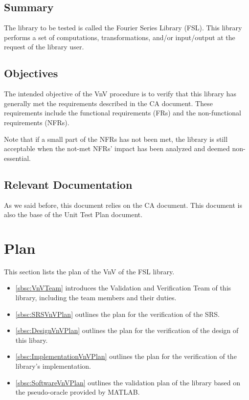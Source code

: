 \documentclass[12pt, titlepage]{article}
\begin{document}
\subsection{Summary}

The library to be tested is called the Fourier Series Library (FSL). This
library performs a set of computations, transformations, and/or input/output at
the request of the library user.

\subsection{Objectives}

The intended objective of the VnV procedure is to verify that this library has
generally met the requirements described in the CA document. These requirements
include the functional requirements (FRs) and the non-functional requirements
(NFRs).

Note that if a small part of the NFRs has not been met, the library is still
acceptable when the not-met NFRs' impact has been analyzed and deemed
non-essential.

\subsection{Relevant Documentation}

As we said before, this document relies on the CA document. This document is
also the base of the Unit Test Plan document.


\section{Plan}
This section lists the plan of the VnV of the FSL library.
\begin{itemize}
	\item \autoref{sbsc:VnVTeam} introduces the Validation and Verification Team of this library, including the team members and their duties.
	\item \autoref{sbsc:SRSVnVPlan} outlines the plan for the verification of the SRS.
	\item \autoref{sbsc:DesignVnVPlan} outlines the plan for the verification of the design of this libary.
	\item \autoref{sbsc:ImplementationVnVPlan} outlines the plan for the verification of the library's implementation.
	\item \autoref{sbsc:SoftwareVnVPlan} outlines the validation plan of the library based on the pseudo-oracle provided by MATLAB.
\end{itemize}
\end{document}
